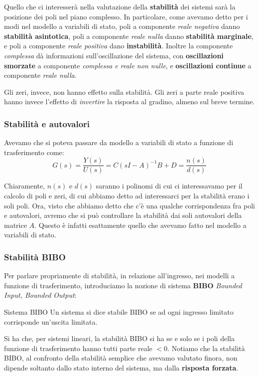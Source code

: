 \documentclass[a4paper,11pt]{article}
\begin{document}
Quello che ci interesserà nella valutazione della \textbf{stabilità} dei sistemi sarà la posizione dei poli nel piano complesso.
In particolare, come avevamo detto per i modi nel modello a variabili di stato, poli a componente \textit{reale negativa} danno \textbf{stabilità asintotica}, poli a componente \textit{reale nulla} danno \textbf{stabilità marginale}, e poli a componente \textit{reale positiva} dano \textbf{instabilità}.
Inoltre la componente \textit{complessa} dà informazioni sull'oscillazione del sistema, con \textbf{oscillazioni smorzate} a componente \textit{complessa e reale non nulle}, e \textbf{oscillazioni continue} a componente \textit{reale nulla}.

Gli zeri, invece, non hanno effetto sulla stabilità.
Gli zeri a parte reale positiva hanno invece l'effetto di \textit{invertire} la risposta al gradino, almeno sul breve termine.

\subsubsection{Stabilità e autovalori}
Avevamo che si poteva passare da modello a variabili di stato a funzione di trasferimento come:
$$
G(s) = \frac{Y(s)}{U(s)} = C(sI - A)^{-1} B + D = \frac{n(s)}{d(s)}
$$

Chiaramente, $n(s)$ e $d(s)$ saranno i polinomi di cui ci interessavamo per il calcolo di poli e zeri, di cui abbiamo detto ad interessarci per la stabilità erano i soli poli.
Ora, visto che abbiamo detto che c'è una qualche corrispondenza fra poli e autovalori, avremo che si può controllare la stabilità dai soli autovalori della matrice $A$.
Questo è infatti esattamente quello che avevamo fatto nel modello a variabili di stato.

\subsubsection{Stabilità BIBO}
Per parlare propriamente di stabilità, in relazione all'ingresso, nei modelli a funzione di trasferimento, introduciamo la nozione di sistema \textbf{BIBO} \textit{Bounded Input, Bounded Output}:
\begin{definition}{Sistema BIBO}
	Un sistema si dice stabile BIBO se ad ogni ingresso limitato corrisponde un'uscita limitata.
\end{definition}

Si ha che, per sistemi lineari, la stabilità BIBO si ha se e solo se i poli della funzione di trasferimento hanno tutti parte reale $< 0$.
Notiamo che la stabilità BIBO, al confronto della stabilità semplice che avevamo valutato finora, non dipende soltanto dallo stato interno del sistema, ma dalla \textbf{risposta forzata}.
\end{document}
